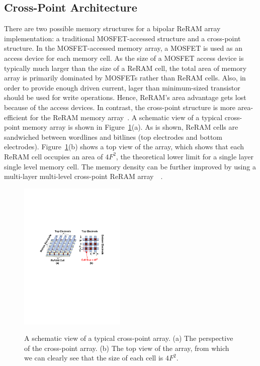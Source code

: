 \subsection{Cross-Point Architecture}
There are two possible memory structures for a bipolar ReRAM array
implementation: a traditional MOSFET-accessed structure and a cross-point
structure. In the MOSFET-accessed memory array, a MOSFET is used as an
access device for each memory cell. As the size of a MOSFET access device
is typically much larger than the size of a ReRAM cell, the total area of
memory array is primarily dominated by MOSFETs rather than ReRAM cells.
Also, in order to provide enough driven current, lager than minimum-sized
transistor should be used for write operations. Hence, ReRAM's area
advantage gets lost because of the access devices.
In contrast, the cross-point structure is more area-efficient for the
ReRAM memory array~\cite{memristor:Cong}. A schematic view of a typical
cross-point memory array is shown in Figure~\ref{fig:array}(a). As is
shown, ReRAM cells are sandwiched between wordlines and bitlines (top
electrodes and bottom electrodes). Figure~\ref{fig:array}(b) shows a top
view of the array, which shows that each ReRAM cell occupies an area of
$4F^2$, the theoretical lower limit for a single layer single level memory
cell. The memory density can be further improved by using a multi-layer
multi-level cross-point ReRAM
array~\cite{crossbar_unity}~\cite{memristor:IEDM08_3D}.

\begin{figure}
\centering
  \includegraphics[width=0.45\textwidth]{./figures/crossbar_array2.pdf}\\\vspace{-10pt}
  \caption{A schematic view of a typical cross-point array. (a) The perspective of the cross-point array.
  (b) The top view of the array, from which we can clearly see that the size of each cell is $4F^2$. }\label{fig:array}
\vspace{-12pt}
\end{figure}

